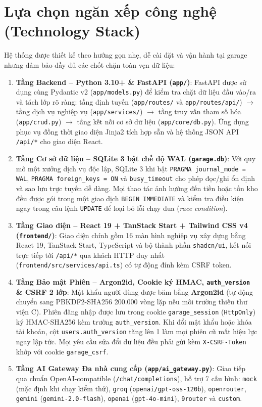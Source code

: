 \section{Lựa chọn ngăn xếp công nghệ (Technology Stack)}

Hệ thống được thiết kế theo hướng gọn nhẹ, dễ cài đặt và vận hành tại garage nhưng đảm bảo đầy đủ các chốt chặn toàn vẹn dữ liệu:

\begin{enumerate}[noitemsep,topsep=2pt]
  \item \textbf{Tầng Backend -- Python 3.10+ \& FastAPI (\texttt{app/})}:
  FastAPI được sử dụng cùng Pydantic v2 (\texttt{app/models.py}) để kiểm tra chặt dữ liệu đầu vào/ra và tách lớp rõ ràng: tầng định tuyến (\texttt{app/routes/} và \texttt{app/routes/api/}) $\rightarrow$ tầng dịch vụ nghiệp vụ (\texttt{app/services/}) $\rightarrow$ tầng truy vấn tham số hóa (\texttt{app/crud.py}) $\rightarrow$ tầng kết nối cơ sở dữ liệu (\texttt{app/core/db.py}). Ứng dụng phục vụ đồng thời giao diện Jinja2 tích hợp sẵn và hệ thống JSON API \texttt{/api/*} cho giao diện React.
  \item \textbf{Tầng Cơ sở dữ liệu -- SQLite 3 bật chế độ WAL (\texttt{garage.db})}:
  Với quy mô một xưởng dịch vụ độc lập, SQLite 3 khi bật \texttt{PRAGMA journal\_mode = WAL}, \texttt{PRAGMA foreign\_keys = ON} và \texttt{busy\_timeout} cho phép đọc/ghi ổn định và sao lưu trực tuyến dễ dàng. Mọi thao tác ảnh hưởng đến tiền hoặc tồn kho đều được gói trong một giao dịch \texttt{BEGIN IMMEDIATE} và kiểm tra điều kiện ngay trong câu lệnh \texttt{UPDATE} để loại bỏ lỗi chạy đua (\textit{race condition}).
  \item \textbf{Tầng Giao diện -- React 19 + TanStack Start + Tailwind CSS v4 (\texttt{frontend/})}:
  Giao diện chính gồm 16 màn hình nghiệp vụ xây dựng bằng React 19, TanStack Start, TypeScript và bộ thành phần \texttt{shadcn/ui}, kết nối trực tiếp tới \texttt{/api/*} qua khách HTTP duy nhất (\texttt{frontend/src/services/api.ts}) có tự động đính kèm CSRF token.
  \item \textbf{Tầng Bảo mật Phiên -- Argon2id, Cookie ký HMAC, \texttt{auth\_version} \& CSRF 2 lớp}:
  Mật khẩu người dùng được băm bằng \textbf{Argon2id} (tự động chuyển sang PBKDF2-SHA256 200.000 vòng lặp nếu môi trường thiếu thư viện C). Phiên đăng nhập được lưu trong cookie \texttt{garage\_session} (\texttt{HttpOnly}) ký HMAC-SHA256 kèm trường \texttt{auth\_version}. Khi đổi mật khẩu hoặc khóa tài khoản, cột \texttt{users.auth\_version} tăng lên 1 làm mọi phiên cũ mất hiệu lực ngay lập tức. Mọi yêu cầu sửa đổi dữ liệu đều phải gửi kèm \texttt{X-CSRF-Token} khớp với cookie \texttt{garage\_csrf}.
  \item \textbf{Tầng AI Gateway Đa nhà cung cấp (\texttt{app/ai\_gateway.py})}:
  Giao tiếp qua chuẩn OpenAI-compatible (\texttt{/chat/completions}), hỗ trợ 7 cấu hình: \texttt{mock} (mặc định khi chạy kiểm thử), \texttt{groq} (\texttt{openai/gpt-oss-120b}), \texttt{openrouter}, \texttt{gemini} (\texttt{gemini-2.0-flash}), \texttt{openai} (\texttt{gpt-4o-mini}), \texttt{9router} và \texttt{custom}.
\end{enumerate}

